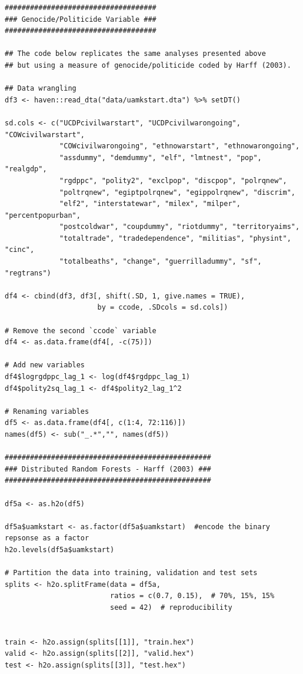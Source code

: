 \documentclass[a4paper,12pt]{article}
\begin{document}
\begin{verbatim}
####################################
### Genocide/Politicide Variable ###
####################################

## The code below replicates the same analyses presented above
## but using a measure of genocide/politicide coded by Harff (2003).

## Data wrangling
df3 <- haven::read_dta("data/uamkstart.dta") %>% setDT()

sd.cols <- c("UCDPcivilwarstart", "UCDPcivilwarongoing", "COWcivilwarstart",
             "COWcivilwarongoing", "ethnowarstart", "ethnowarongoing",
             "assdummy", "demdummy", "elf", "lmtnest", "pop", "realgdp",
             "rgdppc", "polity2", "exclpop", "discpop", "polrqnew",
             "poltrqnew", "egiptpolrqnew", "egippolrqnew", "discrim",
             "elf2", "interstatewar", "milex", "milper", "percentpopurban",
             "postcoldwar", "coupdummy", "riotdummy", "territoryaims",
             "totaltrade", "tradedependence", "militias", "physint", "cinc",
             "totalbeaths", "change", "guerrilladummy", "sf", "regtrans")

df4 <- cbind(df3, df3[, shift(.SD, 1, give.names = TRUE),
                      by = ccode, .SDcols = sd.cols]) 

# Remove the second `ccode` variable
df4 <- as.data.frame(df4[, -c(75)])

# Add new variables
df4$logrgdppc_lag_1 <- log(df4$rgdppc_lag_1)
df4$polity2sq_lag_1 <- df4$polity2_lag_1^2

# Renaming variables
df5 <- as.data.frame(df4[, c(1:4, 72:116)])
names(df5) <- sub("_.*","", names(df5)) 

#################################################
### Distributed Random Forests - Harff (2003) ###
#################################################

df5a <- as.h2o(df5)

df5a$uamkstart <- as.factor(df5a$uamkstart)  #encode the binary repsonse as a factor
h2o.levels(df5a$uamkstart)

# Partition the data into training, validation and test sets
splits <- h2o.splitFrame(data = df5a, 
                         ratios = c(0.7, 0.15),  # 70%, 15%, 15%
                         seed = 42)  # reproducibility


train <- h2o.assign(splits[[1]], "train.hex")   
valid <- h2o.assign(splits[[2]], "valid.hex") 
test <- h2o.assign(splits[[3]], "test.hex")


\end{verbatim}
\end{document}
